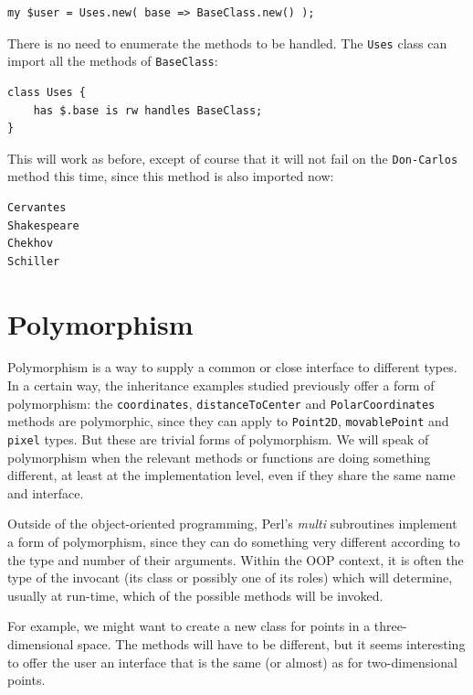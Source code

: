 \begin{verbatim}
my $user = Uses.new( base => BaseClass.new() );
\end{verbatim}

There is no need to enumerate the methods to be handled. The 
{\tt Uses} class can import all the methods of {\tt BaseClass}:

\begin{verbatim}
class Uses { 
    has $.base is rw handles BaseClass;
}
\end{verbatim}

This will work as before, except of course that it will not fail 
on the {\tt Don-Carlos} method this time, since this method is 
also imported now:

\begin{verbatim}
Cervantes
Shakespeare
Chekhov
Schiller
\end{verbatim} 

\section{Polymorphism}

Polymorphism is a way to supply a common or close interface 
to different types. In a certain way, the inheritance examples 
studied previously offer a form of polymorphism: the 
{\tt coordinates}, {\tt distanceToCenter} and {\tt PolarCoordinates} 
methods are polymorphic, since they can apply to 
{\tt Point2D}, {\tt movablePoint} and {\tt pixel} types. But 
these are trivial forms of polymorphism. We will speak of 
polymorphism when the relevant methods or functions are 
doing something different, at least at the implementation 
level, even if they share the same name and interface.

Outside of the object-oriented programming, Perl's 
\emph{multi} subroutines implement a form of polymorphism, 
since they can do something very different according to the 
type and number of their arguments. Within the OOP context, 
it is often the type of the invocant (its class or possibly one 
of its roles) which will determine, usually at run-time, 
which of the possible methods will be invoked.

For example, we might want to create a new class for points 
in a three-dimensional space. The methods will have to be 
different, but it seems interesting to offer the user an 
interface that is the same (or almost) as for two-dimensional 
points.  

